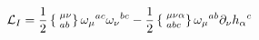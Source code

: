 \begin{equation}
{\cal L}_I = \frac{1}{2} \left\{ \phantom{|}^{\mu\nu}_{ab}
 \right\} \omega_\mu{}^{ac} \omega_\nu{}^{bc} - \frac{1}{2}
\left\{ \phantom{|}^{\mu\nu\alpha}_{abc} \right\}
\omega_\mu{}^{ab} \partial_\nu h_\alpha{}^c \label{eq3}
\end{equation}

